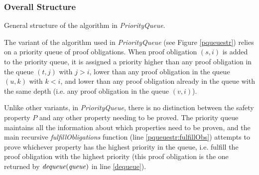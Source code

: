 \documentclass[12pt,a4paper,twoside,openright]{report}
\begin{document}
{{\subsubsection{Overall Structure}
\begin{algorithm}[t]
\DontPrintSemicolon
{}
\Fn{fulfillObligations$(M,[F_0,\ldots,F_k],{\it queue}])$ \label{pqueuestr:fulfillObs}}{
  \Let{$((s,i), {\it q}) = {\it dequeue(queue)}$ \label{dequeue}}{
  \lIf{$F_{i - 1} \wedge T \Rightarrow \neg s'$}{\Return{${\it pushFrame(M, [F_0, \dots, F_k], q, (s,i))}$} \label{pqueuestr:pushFrame}}
  }
  \lElse{\Let{${\it cti = nextCTI(F_{i - 1} \wedge T \Rightarrow \neg s')}$}{
      \If{$I \Rightarrow \neg {\it cti}$ \label{pqueuestr:preprop}}{
        \Let{${\it (fixed, [G_0, \ldots, G_k], d) = propagate([F_0 \cup \{\neg cti\}, F_1, \ldots, F_k], {\it \neg cti})}$ \label{pqueuestr:propagate}}{
          \lIf{\it fixed}{\Return{True} \label{pqueuestr:fix}}
          \Return{${\it fulfillObligation(M, [G_0 , \ldots, G_k], (generalize(\neg cti, d),d))}$ \label{pqueuestr:rec}}
        }
      }
      \lElse{\Return{False}}}}
}
\caption{General structure of the algorithm in {\it PriorityQueue}.}
\label{pqueuestr}
\end{algorithm}

The variant of the algorithm used in \emph{PriorityQueue} (see Figure \ref{pqueuestr})
relies on a priority queue of proof obligations.
When proof obligation $(s,i)$ is added to the priority queue,
it is assigned a priority higher than any proof obligation in the queue $(t,j)$ with $j > i$,
lower than any proof obligation in the queue $(u,k)$ with $k < i$, and lower
than any proof obligation already in the queue with the same depth (i.e. any
proof obligation in the queue $(v, i)$).

Unlike other variants, in {\it PriorityQueue}, there is
no distinction between the safety property $P$ and any other property
needing to be proved.
The priority queue maintains all the information about which properties need to be
proven, and the main recursive {\it fulfillObligations} function (line \ref{pqueuestr:fulfillObs}) attempts to prove
whichever property has the highest priority in the queue, i.e. fulfill the proof obligation with the highest priority (this proof obligation
is the one returned by ${\it dequeue(queue)}$ in line \ref{dequeue}).

}}
\end{document}
